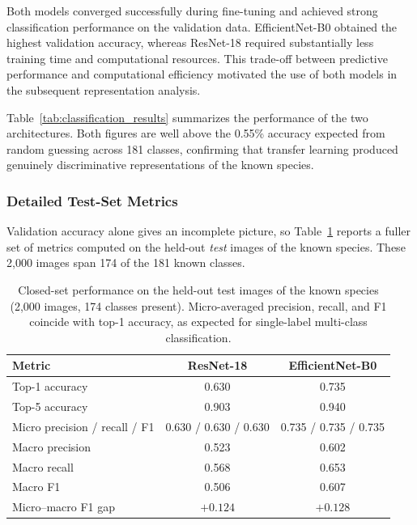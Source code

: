 \documentclass[11pt]{article}
\begin{document}
Both models converged successfully during fine-tuning and achieved strong classification performance on the validation data. EfficientNet-B0 obtained the highest validation accuracy, whereas ResNet-18 required substantially less training time and computational resources. This trade-off between predictive performance and computational efficiency motivated the use of both models in the subsequent representation analysis.

Table~\ref{tab:classification_results} summarizes the performance of the two architectures. Both figures are well above the 0.55\% accuracy expected from random guessing across 181 classes, confirming that transfer learning produced genuinely discriminative representations of the known species.

\subsubsection{Detailed Test-Set Metrics}

Validation accuracy alone gives an incomplete picture, so Table~\ref{tab:closed_set_detail} reports a fuller set of metrics computed on the held-out \emph{test} images of the known species. These 2,000 images span 174 of the 181 known classes.

\begin{table}[H]
\centering
\caption{Closed-set performance on the held-out test images of the known species (2,000 images, 174 classes present). Micro-averaged precision, recall, and F1 coincide with top-1 accuracy, as expected for single-label multi-class classification.}
\label{tab:closed_set_detail}

\begin{tabular}{lcc}
\toprule
Metric & ResNet-18 & EfficientNet-B0 \\
\midrule
Top-1 accuracy      & 0.630 & 0.735 \\
Top-5 accuracy      & 0.903 & 0.940 \\
\midrule
Micro precision / recall / F1 & 0.630 / 0.630 / 0.630 & 0.735 / 0.735 / 0.735 \\
Macro precision     & 0.523 & 0.602 \\
Macro recall        & 0.568 & 0.653 \\
Macro F1            & 0.506 & 0.607 \\
\midrule
Micro--macro F1 gap & $+0.124$ & $+0.128$ \\
\bottomrule
\end{tabular}
\end{table}
\end{document}
